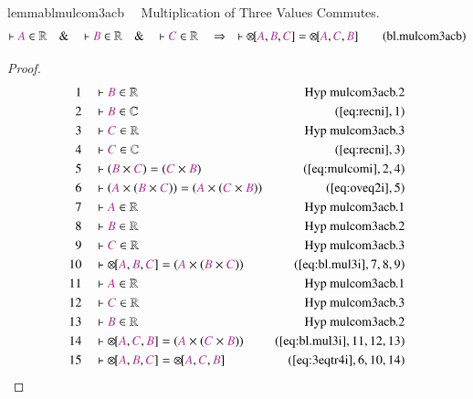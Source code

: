 \begin{restatable}{lemma}{blmulcom3acb}~~ Multiplication of Three Values
Commutes.
\begin{align}
\vdash \mc{A} \in \mathbb{R}\quad\&\quad \vdash \mc{B} \in
    \mathbb{R}\quad\&\quad \vdash \mc{C} \in \mathbb{R}\quad\Rightarrow\quad
    \vdash {\otimes\hspace{-1pt}[} \mc{A} , \mc{B} , \mc{C} ] =
    {\otimes\hspace{-1pt}[} \mc{A} , \mc{C} , \mc{B}
    ]\label{eq:bl.mulcom3acb}\tag{bl.mulcom3acb}
\end{align}
\end{restatable}

\begin{proof}
\begin{align}
  1 &&  & \vdash \mc{B} \in
\mathbb{R}&\text{Hyp~mulcom3acb.2}\notag%
  \\ 2 &&  & \vdash \mc{B} \in \mathbb{C}&(\mbox{\ref{eq:recni}},1)\notag
  \\ 3 &&  & \vdash \mc{C} \in
\mathbb{R}&\text{Hyp~mulcom3acb.3}\notag%
  \\ 4 &&  & \vdash \mc{C} \in \mathbb{C}&(\mbox{\ref{eq:recni}},3)\notag
  \\ 5 &&  & \vdash ( \mc{B} \times \mc{C} ) = ( \mc{C} \times \mc{B}
      )&(\mbox{\ref{eq:mulcomi}},2,4)\notag
  \\ 6 &&  & \vdash ( \mc{A} \times ( \mc{B} \times \mc{C} ) ) = ( \mc{A} \times (
      \mc{C} \times \mc{B} )
      )&(\mbox{\ref{eq:oveq2i}},5)\notag
  \\ 7 &&  & \vdash \mc{A} \in
\mathbb{R}&\text{Hyp~mulcom3acb.1}\notag%
  \\ 8 &&  & \vdash \mc{B} \in
\mathbb{R}&\text{Hyp~mulcom3acb.2}\notag%
  \\ 9 &&  & \vdash \mc{C} \in
\mathbb{R}&\text{Hyp~mulcom3acb.3}\notag%
  \\ 10 &&  & \vdash {\otimes\hspace{-1pt}[} \mc{A} , \mc{B} , \mc{C} ] = (
      \mc{A} \times ( \mc{B} \times \mc{C} )
      )&(\mbox{\ref{eq:bl.mul3i}},7,8,9)\notag
  \\ 11 &&  & \vdash \mc{A} \in
\mathbb{R}&\text{Hyp~mulcom3acb.1}\notag%
  \\ 12 &&  & \vdash \mc{C} \in
\mathbb{R}&\text{Hyp~mulcom3acb.3}\notag%
  \\ 13 &&  & \vdash \mc{B} \in
\mathbb{R}&\text{Hyp~mulcom3acb.2}\notag%
  \\ 14 &&  & \vdash {\otimes\hspace{-1pt}[} \mc{A} , \mc{C} , \mc{B} ] = (
      \mc{A} \times ( \mc{C} \times \mc{B} )
      )&(\mbox{\ref{eq:bl.mul3i}},11,12,13)\notag
  \\ 15 &&  & \vdash {\otimes\hspace{-1pt}[} \mc{A} , \mc{B} , \mc{C} ] =
      {\otimes\hspace{-1pt}[} \mc{A} , \mc{C} , \mc{B}
      ]&(\mbox{\ref{eq:3eqtr4i}},6,10,14)\notag
\end{align}
\end{proof}

